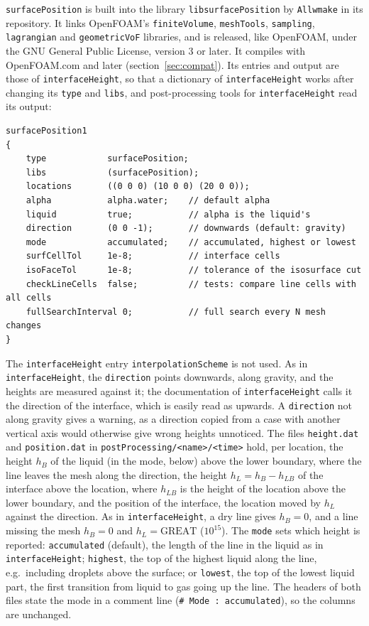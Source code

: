 \documentclass[11pt,a4paper]{article}
\newcommand{\sP}{\texttt{surfacePosition}}
\newcommand{\iH}{\texttt{interfaceHeight}}
\begin{document}
\sP{} is built into the library \texttt{libsurfacePosition} by
\texttt{Allwmake} in its repository. It links OpenFOAM's \texttt{finiteVolume},
\texttt{meshTools}, \texttt{sampling}, \texttt{lagrangian} and
\texttt{geometricVoF} libraries, and is released, like OpenFOAM, under the
GNU General Public License, version 3 or later. It compiles with
OpenFOAM.com \compatFirst{} and later (section~\ref{sec:compat}). Its
entries and output are those of \iH{}, so
that a dictionary of \iH{} works after changing its \texttt{type} and
\texttt{libs}, and post-processing tools for \iH{} read its output:
\begin{lstlisting}
surfacePosition1
{
    type            surfacePosition;
    libs            (surfacePosition);
    locations       ((0 0 0) (10 0 0) (20 0 0));
    alpha           alpha.water;    // default alpha
    liquid          true;           // alpha is the liquid's
    direction       (0 0 -1);       // downwards (default: gravity)
    mode            accumulated;    // accumulated, highest or lowest
    surfCellTol     1e-8;           // interface cells
    isoFaceTol      1e-8;           // tolerance of the isosurface cut
    checkLineCells  false;          // tests: compare line cells with all cells
    fullSearchInterval 0;           // full search every N mesh changes
}
\end{lstlisting}
The \iH{} entry \texttt{interpolationScheme} is not used. As in \iH{}, the
\texttt{direction} points downwards, along gravity, and the heights are
measured against it; the documentation of \iH{} calls it the direction of the
interface, which is easily read as upwards. A \texttt{direction} not along
gravity gives a warning, as a direction copied from a case with another
vertical axis would otherwise give wrong heights unnoticed. The files
\texttt{height.dat} and \texttt{position.dat} in
\texttt{postProcessing/<name>/<time>} hold, per location, the height $h_B$ of the liquid (in the mode, below) above
the lower boundary, where the line leaves the mesh along the direction, the height
$h_L = h_B - h_{LB}$ of the interface above the location, where $h_{LB}$ is the
height of the location above the lower boundary, and the position of the
interface, the location moved by $h_L$ against the direction. As in \iH{}, a
dry line gives $h_B = 0$, and a line missing the mesh $h_B = 0$ and
$h_L = \mathrm{GREAT}$ ($10^{15}$). The \texttt{mode} sets which height is
reported: \texttt{accumulated} (default), the length of the line in the liquid
as in \iH{}; \texttt{highest}, the top of the highest liquid along the line,
e.g.\ including droplets above the surface; or \texttt{lowest}, the top of the
lowest liquid part, the first transition from liquid to gas going up the line.
The headers of both files state the mode in a comment line
(\texttt{\# Mode : accumulated}), so the columns are unchanged.
\end{document}
